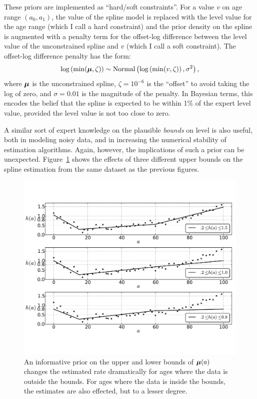 These priors are implemented as ``hard/soft constraints''.  For a
value $v$ on age range $(a_0,a_1)$, the value of the spline model is
replaced with the level value for the age range (which I call a hard
constraint) and the prior density on the spline is augmented with a
penalty term for the offset-log difference between the level value of
the unconstrained spline and $v$ (which I call a soft constraint). The
offset-log difference penalty has the form:
\[
\log\left(\min(\boldsymbol{\mu}, \zeta)\right) \sim \operatorname{Normal}\left(\log\left(\min(v, \zeta)\right), \sigma^2\right),
\]
where $\boldsymbol{\mu}$ is the unconstrained spline, $\zeta = 10^{-6}$ is the
``offset'' to avoid taking the log of zero, and $\sigma = 0.01$ is the
magnitude of the penalty.  In Bayesian terms, this encodes the belief
that the spline is expected to be within 1\% of the expert level
value, provided the level value is not too close to zero.

A similar sort of expert knowledge on the plausible \emph{bounds} on
level is also useful, both in modeling noisy data, and in increasing
the numerical stability of estimation algorithms. Again, however, the
implications of such a prior can be unexpected.
Figure~\ref{level-bounds-priors} shows the effects of three different
upper bounds on the spline estimation from the same dataset as the
previous figures.

\begin{figure}[h]
\begin{center}
\includegraphics[width=\textwidth]{level_bound-smoothing-splines.pdf}
\caption{An informative prior on the upper and
lower bounds of $\boldsymbol{\mu}(a)$ changes the estimated rate dramatically for
ages where the data is outside the bounds. For ages where the data is
inside the bounds, the estimates are also effected, but to a lesser
degree.}
\label{level-bounds-priors}
\end{center}
\end{figure}



